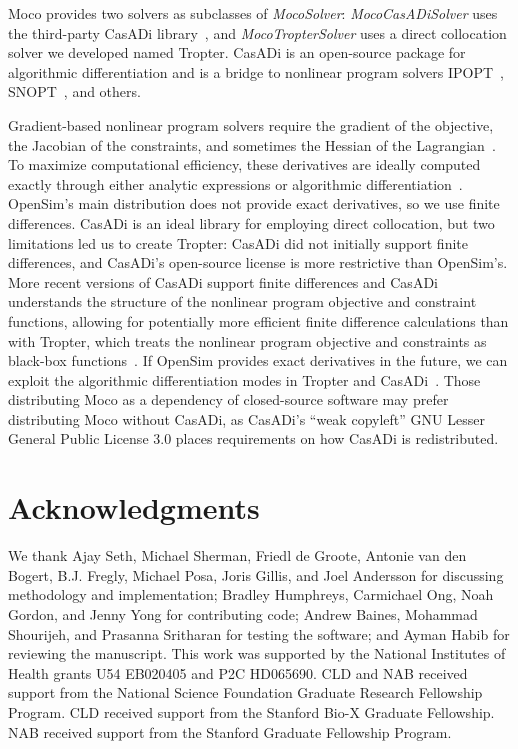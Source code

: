 \documentclass[10pt,letterpaper]{article}
\begin{document}
Moco provides two solvers as subclasses of \textit{MocoSolver}: \textit{MocoCasADiSolver} uses the third-party CasADi library~\cite{Andersson:2019}, and \textit{MocoTropterSolver} uses a direct collocation solver we developed named Tropter. CasADi is an open-source package for algorithmic differentiation and is a bridge to nonlinear program solvers IPOPT~\cite{Wachter:2006}, SNOPT~\cite{Gill:2005}, and others.

Gradient-based nonlinear program solvers require the gradient of the objective, the Jacobian of the constraints, and sometimes the Hessian of the Lagrangian~\cite{Betts:2010}. To maximize computational efficiency, these derivatives are ideally computed exactly through either analytic expressions or algorithmic differentiation~\cite{Andersson:2019,Walther:2003}. OpenSim’s main distribution does not provide exact derivatives, so we use finite differences. CasADi is an ideal library for employing direct collocation, but two limitations led us to create Tropter: CasADi did not initially support finite differences, and CasADi’s open-source license is more restrictive than OpenSim’s. More recent versions of CasADi support finite differences and CasADi understands the structure of the nonlinear program objective and constraint functions, allowing for potentially more efficient finite difference calculations than with Tropter, which treats the nonlinear program objective and constraints as black-box functions~\cite{Patterson:2012}. If OpenSim provides exact derivatives in the future, we can exploit the algorithmic differentiation modes in Tropter and CasADi~\cite{Falisse:2019a}. Those distributing Moco as a dependency of closed-source software may prefer distributing Moco without CasADi, as CasADi’s “weak copyleft” GNU Lesser General Public License 3.0 places requirements on how CasADi is redistributed.


\section*{Acknowledgments}

We thank Ajay Seth, Michael Sherman, Friedl de Groote, Antonie van den Bogert, B.J. Fregly, Michael Posa, Joris Gillis, and Joel Andersson for discussing methodology and implementation; Bradley Humphreys, Carmichael Ong, Noah Gordon, and Jenny Yong for contributing code; Andrew Baines, Mohammad Shourijeh, and Prasanna Sritharan for testing the software; and Ayman Habib for reviewing the manuscript.
This work was supported by the National Institutes of Health grants U54 EB020405 and P2C HD065690. CLD and NAB received support from the National Science Foundation Graduate Research Fellowship Program. CLD received support from the Stanford Bio-X Graduate Fellowship. NAB received support from the Stanford Graduate Fellowship Program.
\end{document}
